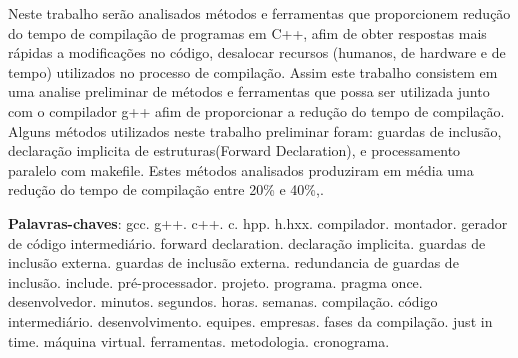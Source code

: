 \begin{resumo}
Neste trabalho serão analisados métodos e ferramentas
 que proporcionem redução do tempo de compilação
 de programas em C++, afim de obter respostas mais
 rápidas a modificações no código, desalocar recursos
 (humanos, de hardware e de tempo) utilizados no processo
 de compilação. Assim este trabalho consistem em uma
 analise preliminar de métodos e ferramentas que possa
 ser utilizada junto com o compilador g++ afim de proporcionar
 a redução do tempo de compilação. Alguns métodos utilizados
 neste trabalho preliminar foram:  guardas de inclusão,
 declaração implicita de estruturas(Forward Declaration),
 e processamento paralelo com makefile.
 Estes métodos analisados produziram em média uma redução
 do tempo de compilação entre 20\% e 40\%,.

 \vspace{\onelineskip}
    
 \noindent
 \textbf{Palavras-chaves}: gcc. g++. c++. c. hpp. h.hxx. compilador. montador. gerador de código intermediário. forward declaration. declaração implicita.  guardas de inclusão externa. guardas de inclusão externa. redundancia de guardas de inclusão. include. pré-processador. projeto. programa. pragma once. desenvolvedor. minutos. segundos. horas. semanas. compilação. código intermediário. desenvolvimento. equipes. empresas. fases da compilação. just in time. máquina virtual. ferramentas. metodologia. cronograma.

\end{resumo}
